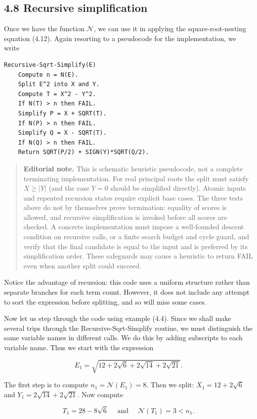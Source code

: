 \documentclass[11pt,letterpaper]{article}
\newcommand{\editorialnote}[1]{\begin{quote}\small\noindent
  \textbf{Editorial note.} #1\end{quote}}
\begin{document}
\subsection*{4.8 Recursive simplification}
Once we have the function $\mathcal{N}$, we can use it in applying the square-root-nesting equation (4.12). Again resorting to a pseudocode for the implementation, we write

\begin{lstlisting}
Recursive-Sqrt-Simplify(E)
    Compute n = N(E).
    Split E^2 into X and Y.
    Compute T = X^2 - Y^2.
    If N(T) > n then FAIL.
    Simplify P = X + SQRT(T).
    If N(P) > n then FAIL.
    Simplify Q = X - SQRT(T).
    If N(Q) > n then FAIL.
    Return SQRT(P/2) + SIGN(Y)*SQRT(Q/2).
\end{lstlisting}
\editorialnote{This is schematic heuristic pseudocode, not a complete terminating
implementation. For real principal roots the split must satisfy $X\geq|Y|$
(and the case $Y=0$ should be simplified directly). Atomic inputs and repeated
recursion states require explicit base cases. The three tests above do not by
themselves prove termination: equality of scores is allowed, and recursive
simplification is invoked before all scores are checked. A concrete
implementation must impose a well-founded descent condition on recursive
calls, or a finite search budget and cycle guard, and verify that the final
candidate is equal to the input and is preferred by its simplification order.
These safeguards may cause a heuristic to return FAIL even when another
split could succeed.}

Notice the advantage of recursion: this code uses a uniform structure rather than separate branches for each term count. However, it does not include any attempt to sort the expression before splitting, and so will miss some cases.

Now let us step through the code using example (4.4). Since we shall make several trips through the Recursive-Sqrt-Simplify routine, we must distinguish the same variable names in different calls. We do this by adding subscripts to each variable name. Thus we start with the expression

\[
E_{1}=\sqrt{12+2 \sqrt{6}+2 \sqrt{14}+2 \sqrt{21}} .
\]

The first step is to compute $n_{1}=\mathcal{N}\left(E_{1}\right)=8$. Then we split: $X_{1}=12+2 \sqrt{6}$ and $Y_{1}=2 \sqrt{14}+2 \sqrt{21}$. Now compute

\[
T_{1}=28-8 \sqrt{6} \quad \text { and } \quad \mathcal{N}\left(T_{1}\right)=3<n_{1} .
\]
\end{document}

